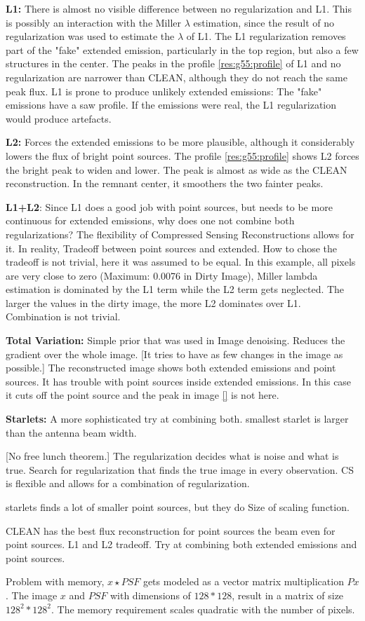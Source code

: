 \textbf{L1:} There is almost no visible difference between no regularization and L1. This is possibly an interaction with the Miller $\lambda$ estimation, since the result of no regularization was used to estimate the $\lambda$ of L1. The L1 regularization removes part of the "fake" extended emission, particularly in the top region, but also a few structures in the center. The peaks in the profile \ref{res:g55:profile} of L1 and no regularization are narrower than CLEAN, although they do not reach the same peak flux. L1 is prone to produce unlikely extended emissions: The "fake" emissions have a saw profile. If the emissions were real, the L1 regularization would produce artefacts.

\textbf{L2:} Forces the extended emissions to be more plausible, although it considerably lowers the flux of bright point sources. The profile \ref{res:g55:profile} shows L2 forces the bright peak to widen and lower. The peak is almost as wide as the CLEAN reconstruction. In the remnant center, it smoothers the two fainter peaks.

\textbf{L1+L2}: Since L1 does a good job with point sources, but needs to be more continuous for extended emissions, why does one not combine both regularizations? The flexibility of Compressed Sensing Reconstructions allows for it. In reality, Tradeoff between point sources and extended. How to chose the tradeoff is not trivial, here it was assumed to be  equal. In this example, all pixels are very close to zero (Maximum: 0.0076 in Dirty Image), Miller lambda estimation is dominated by the L1 term while the L2 term gets neglected. The larger the values in the dirty image, the more L2 dominates over L1. Combination is not trivial.

\textbf{Total Variation:} Simple prior that was used in Image denoising. Reduces the gradient over the whole image. [It tries to have as few changes in the image as possible.] The reconstructed image shows both extended emissions and point sources. It has trouble with point sources inside extended emissions. In this case it cuts off the point source and the peak in image \ref{} is not here.

\textbf{Starlets:} A more sophisticated try at combining both. smallest starlet is larger than the antenna beam width.



[No free lunch theorem.] The regularization decides what is noise and what is true. Search for regularization that finds the true image in every observation. CS is flexible and allows for a combination of regularization.

starlets finds a lot of smaller point sources, but they do
Size of scaling function.

CLEAN has the best flux reconstruction for point sources the beam even for point sources. L1 and L2 tradeoff. Try at combining both extended emissions and point sources.

Problem with memory, $x \star PSF$ gets modeled as a vector matrix multiplication $Px$. The image $x$ and $PSF$ with dimensions of $128 * 128$, result in a matrix of size $128^2 * 128^2$. The memory requirement scales quadratic with the number of pixels. 



